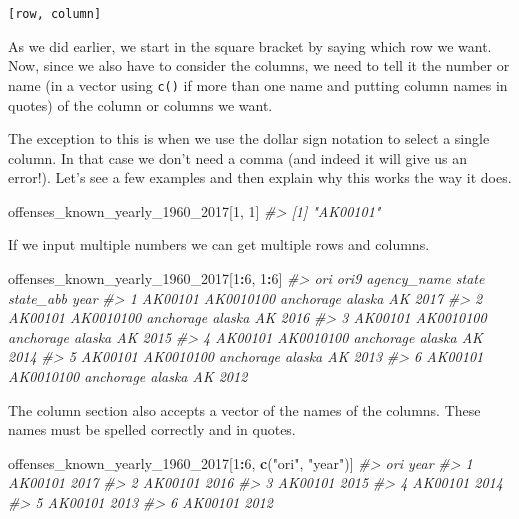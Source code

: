 \documentclass[
  12pt,
]{book}
\newenvironment{Shaded}{\begin{snugshade}}{\end{snugshade}}
\newcommand{\CommentTok}[1]{\textcolor[rgb]{0.56,0.35,0.01}{\textit{#1}}}
\newcommand{\DecValTok}[1]{\textcolor[rgb]{0.00,0.00,0.81}{#1}}
\newcommand{\KeywordTok}[1]{\textcolor[rgb]{0.13,0.29,0.53}{\textbf{#1}}}
\newcommand{\NormalTok}[1]{#1}
\newcommand{\OperatorTok}[1]{\textcolor[rgb]{0.81,0.36,0.00}{\textbf{#1}}}
\newcommand{\StringTok}[1]{\textcolor[rgb]{0.31,0.60,0.02}{#1}}
\begin{document}
\texttt{{[}row,\ column{]}}

As we did earlier, we start in the square bracket by saying which row we want. Now, since we also have to consider the columns, we need to tell it the number or name (in a vector using \texttt{c()} if more than one name and putting column names in quotes) of the column or columns we want.

The exception to this is when we use the dollar sign notation to select a single column. In that case we don't need a comma (and indeed it will give us an error!). Let's see a few examples and then explain why this works the way it does.

\begin{Shaded}
\begin{Highlighting}[]
\NormalTok{offenses\_known\_yearly\_}\DecValTok{1960}\NormalTok{\_}\DecValTok{2017}\NormalTok{[}\DecValTok{1}\NormalTok{, }\DecValTok{1}\NormalTok{]}
\CommentTok{\#> [1] "AK00101"}
\end{Highlighting}
\end{Shaded}

If we input multiple numbers we can get multiple rows and columns.

\begin{Shaded}
\begin{Highlighting}[]
\NormalTok{offenses\_known\_yearly\_}\DecValTok{1960}\NormalTok{\_}\DecValTok{2017}\NormalTok{[}\DecValTok{1}\OperatorTok{:}\DecValTok{6}\NormalTok{, }\DecValTok{1}\OperatorTok{:}\DecValTok{6}\NormalTok{]}
\CommentTok{\#>       ori      ori9 agency\_name  state state\_abb year}
\CommentTok{\#> 1 AK00101 AK0010100   anchorage alaska        AK 2017}
\CommentTok{\#> 2 AK00101 AK0010100   anchorage alaska        AK 2016}
\CommentTok{\#> 3 AK00101 AK0010100   anchorage alaska        AK 2015}
\CommentTok{\#> 4 AK00101 AK0010100   anchorage alaska        AK 2014}
\CommentTok{\#> 5 AK00101 AK0010100   anchorage alaska        AK 2013}
\CommentTok{\#> 6 AK00101 AK0010100   anchorage alaska        AK 2012}
\end{Highlighting}
\end{Shaded}

The column section also accepts a vector of the names of the columns. These names must be spelled correctly and in quotes.

\begin{Shaded}
\begin{Highlighting}[]
\NormalTok{offenses\_known\_yearly\_}\DecValTok{1960}\NormalTok{\_}\DecValTok{2017}\NormalTok{[}\DecValTok{1}\OperatorTok{:}\DecValTok{6}\NormalTok{, }\KeywordTok{c}\NormalTok{(}\StringTok{"ori"}\NormalTok{, }\StringTok{"year"}\NormalTok{)]}
\CommentTok{\#>       ori year}
\CommentTok{\#> 1 AK00101 2017}
\CommentTok{\#> 2 AK00101 2016}
\CommentTok{\#> 3 AK00101 2015}
\CommentTok{\#> 4 AK00101 2014}
\CommentTok{\#> 5 AK00101 2013}
\CommentTok{\#> 6 AK00101 2012}
\end{Highlighting}
\end{Shaded}
\end{document}
